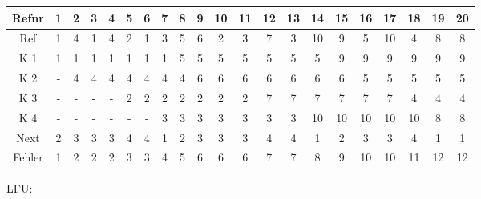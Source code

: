 \begin{enumerate}[a)]
\begin{note}
\begin{tabular}{|c||c|c|c|c|c|c|c|c|c|c|c|c|c|c|c|c|c|c|c|c|}
	\hline
	\rowcolor{lightgray} Refnr & 1 & 2 & 3 & 4 & 5 & 6 & 7 & 8 & 9 & 10 & 11 & 12 & 13 & 14 & 15 & 16 & 17 & 18 & 19 & 20 \\
	\hline
	\rowcolor{lightgray} Ref & 1 & 4 & 1 & 4 & 2 & 1 & 3 & 5 & 6 & 2 & 3 & 7 & 3 & 10 & 9 & 5 & 10 & 4 & 8 & 8 \\
	\hline \hline
	K 1 & \color{blue} 1 & 1 & \color{blue} 1 & 1 & 1 & \color{blue} 1 & 1 & \color{blue} 5 & 5 & 5 & 5 & 5 & 5 & 5 & \color{blue} 9 & 9 & 9 & 9 & 9 & 9 \\
	\hline
	K 2 & - & \color{blue} 4 & 4 & \color{blue} 4 & 4 & 4 & 4 & 4 & \color{blue} 6 & 6 & 6 & 6 & 6 & 6 & 6 & \color{blue} 5 & 5 & 5 & 5 & 5 \\
	\hline
	K 3 & - & - & - & - & \color{blue} 2 & 2 & 2 & 2 & 2 & \color{blue} 2 & 2 & \color{blue} 7 & 7 & 7 & 7 & 7 & 7 & \color{blue} 4 & 4 & 4 \\
	\hline
	K 4 & - & - & - & - & - & - & \color{blue} 3 & 3 & 3 & 3 & \color{blue} 3 & 3 & \color{blue} 3 & \color{blue} 10 & 10 & 10 & \color{blue} 10 & 10 & \color{blue} 8 & \color{blue} 8 \\
	\hline \hline
	\rowcolor{lightgray} Next & 2 & 3 & 3 & 3 & 4 & 4 & 1 & 2 & 3 & 3 & 3 & 4 & 4 & 1 & 2 & 3 & 3 & 4 & 1 & 1 \\
	\hline
	Fehler & 1 & 2 & 2 & 2 & 3 & 3 & 4 & 5 & 6 & 6 & 6 & 7 & 7 & 8 & 9 & 10 & 10 & 11 & 12 & 12 \\
	\hline
\end{tabular}

LFU:\nopagebreak


\end{note}
\end{enumerate}
